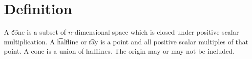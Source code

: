 
\section*{Definition}

A \t{cone} is a subset of $n$-dimensional space which is closed under positive scalar multiplication.
A \t{halfline} or \t{ray} is a point and all positive scalar multiples of that point.
A cone is a union of halflines.
The origin may or may not be included.

\blankpage